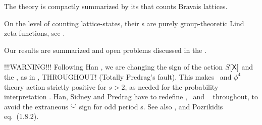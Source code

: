 The theory is compactly summarized by its {\tzeta} 
that counts Bravais lattices.

On the level of counting lattice-states, their {\tzeta}s are purely
group-theoretic Lind zeta functions, see .

Our results are summarized and open problems discussed in the
.

     {
                    {\color{red}
!!!WARNING!!!
Following Han , we are changing the sign of the
action $S[\mathsf{X}]$ and the {\jacobianOrb}, as in ,
THROUGHOUT! (Totally Predrag's fault).
This makes \catlatt\ and {$\phi^4$} theory action strictly positive
for
${s}>2$, as
needed for the probability interpretation .
                    }
Han, Sidney and Predrag have to redefine
\templatt, \catlatt\ and \henlatt\ {\jacobianOrbs} throughout, to avoid the
extraneous `-' sign for odd period {\lattstate}s.
%
See also , and Pozrikidis
 eq.~(1.8.2).
    }
